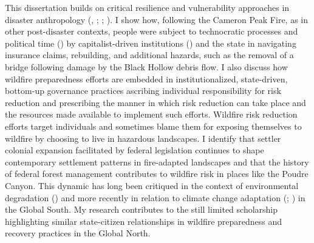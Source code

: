 \documentclass[
]{article}
\begin{document}
This dissertation builds on critical resilience and vulnerability approaches in disaster anthropology (, ; ; ). I show how, following the Cameron Peak Fire, as in other post-disaster contexts, people were subject to technocratic processes and political time () by capitalist-driven institutions () and the state in navigating insurance claims, rebuilding, and additional hazards, such as the removal of a bridge following damage by the Black Hollow debris flow. I also discuss how wildfire preparedness efforts are embedded in institutionalized, state-driven, bottom-up governance practices ascribing individual responsibility for risk reduction and prescribing the manner in which risk reduction can take place and the resources made available to implement such efforts. Wildfire risk reduction efforts target individuals and sometimes blame them for exposing themselves to wildfire by choosing to live in hazardous landscapes. I identify that settler colonial expansion facilitated by federal legislation continues to shape contemporary settlement patterns in fire-adapted landscapes and that the history of federal forest management contributes to wildfire risk in places like the Poudre Canyon. This dynamic has long been critiqued in the context of environmental degradation () and more recently in relation to climate change adaptation (; ) in the Global South. My research contributes to the still limited scholarship highlighting similar state-citizen relationships in wildfire preparedness and recovery practices in the Global North.
\end{document}
